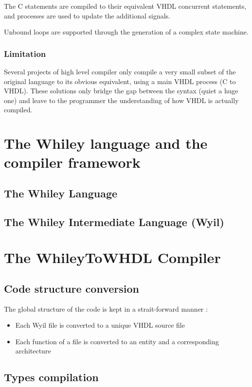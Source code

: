 \documentclass[10pt,a4paper]{article}
\begin{document}
The C statements are compiled to their equivalent VHDL concurrent statements, and processes are used to update the additional signals.

Unbound loops are supported through the generation of a complex state machine.

\subsubsection{Limitation}

Several projects of high level compiler only compile a very small subset of the original language to its obvious equivalent, using a main VHDL process (C to VHDL).
These solutions only bridge the gap between the syntax (quiet a huge one) and leave to the programmer the understanding of how VHDL is actually compiled.


\section{The Whiley language and the compiler framework}

\subsection{The Whiley Language}

\subsection{The Whiley Intermediate Language (Wyil)}


\section{The WhileyToWHDL Compiler}

\subsection{Code structure conversion}

The global structure of the code is kept in a strait-forward manner :
\begin{itemize}
	\item Each Wyil file is converted to a unique VHDL source file
	\item Each function of a file is converted to an entity and a corresponding architecture
\end{itemize}


\subsection{Types compilation}
\end{document}
